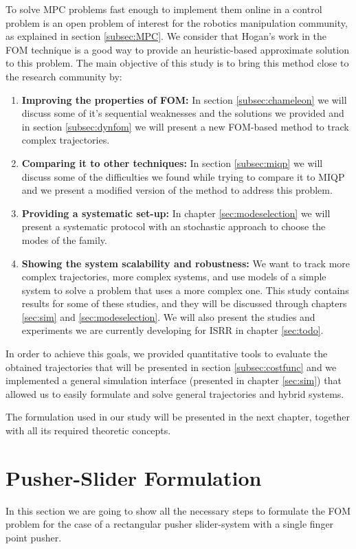 \documentclass[12,twoside]{TFG-GM}
\theoremstyle{definition}
\theoremstyle{remark}
\begin{document}
To solve MPC problems fast enough to implement them online in a control problem is an open problem of interest for the robotics manipulation community, as explained in section \ref{subsec:MPC}. We consider that Hogan's work in the FOM technique is a good way to provide an heuristic-based approximate solution to this problem. The main objective of this study is to bring this method close to the research community by:
\begin{enumerate}
\item {\textbf{Improving the properties of FOM:}} In section \ref{subsec:chameleon} we will discuss some of it's sequential weaknesses and the solutions we provided and in section \ref{subsec:dynfom} we will present a new FOM-based method to track complex trajectories.

\item{\textbf{Comparing it to other techniques:}} In section \ref{subsec:miqp} we will discuss some of the difficulties we found while trying to compare it to MIQP and we present a modified version of the method to address this problem.

\item{\textbf{Providing a systematic set-up:}} In chapter \ref{sec:modeselection} we will present a systematic protocol with an stochastic approach to choose the modes of the family.

\item{\textbf{Showing the system scalability and robustness:}} We want to track more complex trajectories, more complex systems, and use models of a simple system to solve a problem that uses a more complex one. This study contains results for some of these studies, and they will be discussed through chapters \ref{sec:sim} and \ref{sec:modeselection}. We will also present the studies and experiments we are currently developing for ISRR in chapter \ref{sec:todo}.
\end{enumerate} 

In order to achieve this goals, we provided quantitative tools to evaluate the obtained trajectories that will be presented in section \ref{subsec:costfunc} and we implemented a general simulation interface (presented in chapter \ref{sec:sim}) that allowed us to easily formulate and solve general trajectories and hybrid systems.

The formulation used in our study will be presented in the next chapter, together with all its required theoretic concepts.

\section{Pusher-Slider Formulation}
\label{sec:formulation}
In this section we are going to show all the necessary steps to formulate the FOM problem for the case of a rectangular pusher slider-system with a single finger point pusher.
\end{document}
